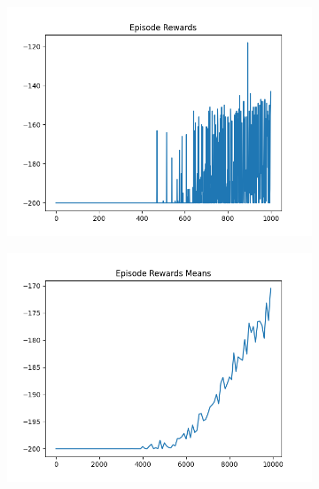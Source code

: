 \begin{figure}[H]
    \centering
    \begin{subfigure}{.47\linewidth}
        \centering
        \includegraphics[width=\textwidth]{mountain/2024-06-15_10-54-10_dqn_mountaincar_episode_rewards.png}
    \end{subfigure}
    \begin{subfigure}{.47\linewidth}
        \centering
        \includegraphics[width=\textwidth]{mountain/2024-06-15_12-16-56_dqn_mountaincar_episode_rewards_means.png}
    \end{subfigure}
    \begin{subfigure}{.47\linewidth}
        \centering

\end{subfigure}
\end{figure}
